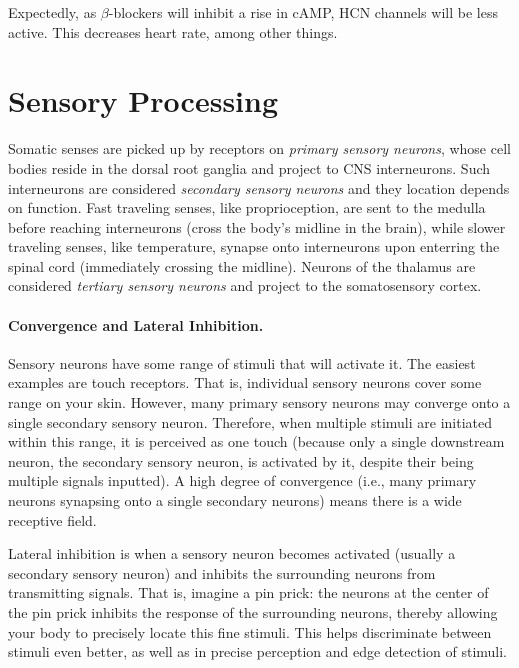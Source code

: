 Expectedly, as $\beta$-blockers will inhibit a rise in cAMP, HCN channels will be less active. This decreases heart rate, among other things. 


\chapter{Sensory Processing}

Somatic senses are picked up by receptors on \textit{primary sensory neurons}, whose cell bodies reside in the dorsal root ganglia and project to CNS interneurons. Such interneurons are considered \textit{secondary sensory neurons} and they location depends on function. Fast traveling senses, like proprioception, are sent to the medulla before reaching interneurons (cross the body's midline in the brain), while slower traveling senses, like temperature, synapse onto interneurons upon enterring the spinal cord (immediately crossing the midline). Neurons of the thalamus are considered \textit{tertiary sensory neurons} and project to the somatosensory cortex. 

\subsubsection{Convergence and Lateral Inhibition.}

Sensory neurons have some range of stimuli that will activate it. The easiest examples are touch receptors. That is, individual sensory neurons cover some range on your skin. However, many primary sensory neurons may converge onto a single secondary sensory neuron. Therefore, when multiple stimuli are initiated within this range, it is perceived as one touch (because only a single downstream neuron, the secondary sensory neuron, is activated by it, despite their being multiple signals inputted). A high degree of convergence (i.e., many primary neurons synapsing onto a single secondary neurons) means there is a wide receptive field.\newline

Lateral inhibition is when a sensory neuron becomes activated (usually a secondary sensory neuron) and inhibits the surrounding neurons from transmitting signals. That is, imagine a pin prick: the neurons at the center of the pin prick inhibits the response of the surrounding neurons, thereby allowing your body to precisely locate this fine stimuli. This helps discriminate between stimuli even better, as well as in precise perception and edge detection of stimuli.\newline

